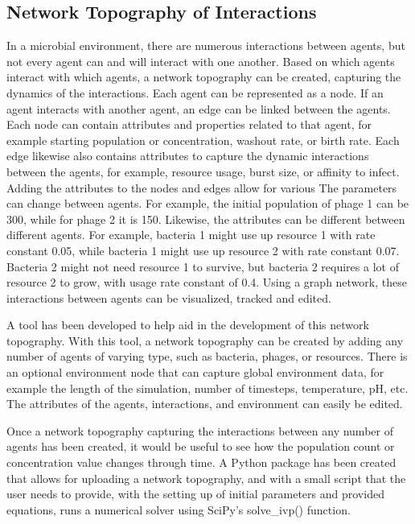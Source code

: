 \subsection{Network Topography of Interactions}
In a microbial environment, there are numerous interactions between agents, but not every agent can and will interact with one another. Based on which agents interact with which agents, a network topography can be created, capturing the dynamics of the interactions. Each agent can be represented as a node. If an agent interacts with another agent, an edge can be linked between the agents. Each node can contain attributes and properties related to that agent, for example starting population or concentration, washout rate, or birth rate. Each edge likewise also contains attributes to capture the dynamic interactions between the agents, for example, resource usage, burst size, or affinity to infect. Adding the attributes to the nodes and edges allow for various The parameters can change between agents. For example, the initial population of phage 1 can be 300, while for phage 2 it is 150. Likewise, the attributes can be different between different agents. For example, bacteria 1 might use up resource 1 with rate constant 0.05, while bacteria 1 might use up resource 2 with rate constant 0.07. Bacteria 2 might not need resource 1 to survive, but bacteria 2 requires a lot of resource 2 to grow, with usage rate constant of 0.4. Using a graph network, these interactions between agents can be visualized, tracked and edited. \newline 

A tool has been developed to help aid in the development of this network topography. With this tool, a network topography can be created by adding any number of agents of varying type, such as bacteria, phages, or resources. There is an optional environment node that can capture global environment data, for example the length of the simulation, number of timesteps, temperature, pH, etc. The attributes of the agents, interactions, and environment can easily be edited. \newline 

Once a network topography capturing the interactions between any number of agents has been created, it would be useful to see how the population count or concentration value changes through time. 
A Python package has been created that allows for uploading a network topography, and with a small script that the user needs to provide, with the setting up of initial parameters and provided equations, runs a numerical solver using SciPy's solve\_ivp() function. 